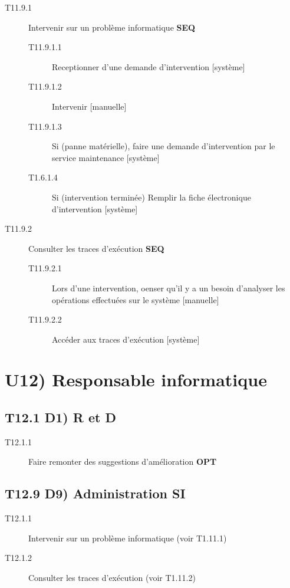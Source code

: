 	
	\begin{description}
	\item[T11.9.1] Intervenir sur un problème informatique \textbf{SEQ}
		\begin{description}
		\item[T11.9.1.1] Receptionner d'une demande d'intervention [système]
		\item[T11.9.1.2] Intervenir [manuelle]
		\item[T11.9.1.3] Si (panne matérielle), faire une demande d'intervention par
		le service maintenance [système]
		\item[T1.6.1.4] Si (intervention terminée) Remplir la fiche électronique
		d'intervention [système]
		\end{description}
	\item[T11.9.2] Consulter les traces d'exécution \textbf{SEQ}
		\begin{description}
		\item[T11.9.2.1] Lors d'une intervention, oenser qu'il y a un besoin
		d'analyser les opérations effectuées sur le système [manuelle]
		\item[T11.9.2.2] Accéder aux traces d'exécution [système]
		\end{description}
	\end{description} 
	
\section{U12) Responsable informatique}
	\subsection{T12.1 D1) R et D}
	\begin{description}
	\item[T12.1.1] Faire remonter des suggestions d'amélioration \textbf{OPT}
	\end{description}
	
	\subsection{T12.9 D9) Administration SI}
	\begin{description}
	\item[T12.1.1] Intervenir sur un problème informatique (voir T1.11.1)
	\item[T12.1.2] Consulter les traces d'exécution (voir T1.11.2)
	\end{description}
